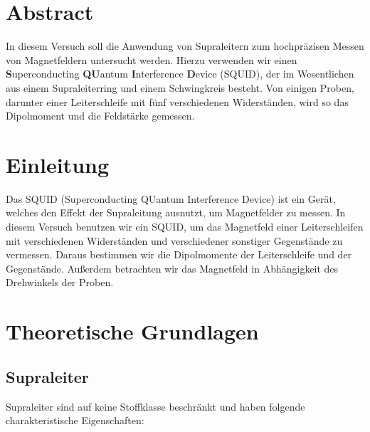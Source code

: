\documentclass[12pt]{article}
\title{\vspace{0cm}{\Huge Fortgeschrittenen-Praktikum I:\\ \vspace{1cm} SQUID}}
\author{Saskia Bondza\\Simon Stephan}
\date{durchgeführt am 23.09.2016}
\begin{document}
\maketitle
\newpage

\section*{Abstract}

In diesem Versuch soll die Anwendung von Supraleitern zum hochpräzisen  Messen von Magnetfeldern untersucht werden. Hierzu verwenden wir einen \textbf{S}uperconducting \textbf{QU}antum \textbf{I}nterference \textbf{D}evice (SQUID), der im Wesentlichen aus einem Supraleiterring und einem Schwingkreis besteht. Von einigen Proben, darunter einer Leiterschleife mit fünf verschiedenen Widerständen, wird so das Dipolmoment und die Feldstärke gemessen.

\newpage

\thispagestyle{empty}
\tableofcontents
\newpage

\section{Einleitung}

Das SQUID (Superconducting QUantum Interference Device) ist ein Gerät, welches den Effekt der Supraleitung ausnutzt, um Magnetfelder zu messen. In diesem Versuch benutzen wir ein SQUID, um das Magnetfeld einer Leiterschleifen mit verschiedenen Widerständen und verschiedener sonstiger Gegenstände zu vermessen. Daraus bestimmen wir die Dipolmomente der Leiterschleife und der Gegenstände. Außerdem betrachten wir das Magnetfeld in Abhängigkeit des Drehwinkels der Proben.


\newpage
\section{Theoretische Grundlagen}


\subsection{Supraleiter}\label{supraleiter}
Supraleiter sind auf keine Stoffklasse beschränkt und haben folgende charakteristische Eigenschaften:
\end{document}
